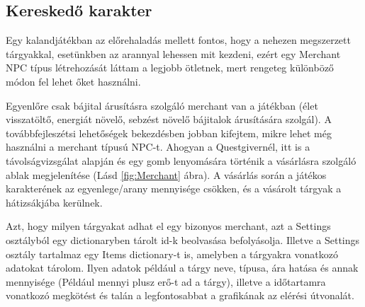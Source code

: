 \subsection{Kereskedő karakter}

\indent \indent Egy kalandjátékban az előrehaladás mellett fontos, hogy a nehezen megszerzett tárgyakkal, esetünkben az arannyal lehessen mit kezdeni, ezért egy Merchant NPC típus létrehozását láttam a legjobb ötletnek, mert rengeteg különböző módon fel lehet őket használni. 

Egyenlőre csak bájital árusításra szolgáló merchant van a játékban (élet visszatöltő, energiát növelő, sebzést növelő bájitalok árusítására szolgál). A továbbfejleszétsi lehetőségek bekezdésben jobban kifejtem, mikre lehet még használni a merchant típusú NPC-t.  Ahogyan a Questgivernél, itt is a távolságvizsgálat alapján és egy gomb lenyomására történik a vásárlásra szolgáló ablak megjelenítése (Lásd \ref{fig:Merchant} ábra). A vásárlás során a játékos karakterének az egyenlege/arany mennyisége csökken, és a vásárolt tárgyak a hátizsákjába kerülnek.

Azt, hogy milyen tárgyakat adhat el egy bizonyos merchant, azt a Settings osztályból egy dictionaryben tárolt id-k beolvasása befolyásolja. Illetve a Settings osztály tartalmaz egy Items dictionary-t is, amelyben a tárgyakra vonatkozó adatokat tárolom. Ilyen adatok például a tárgy neve, típusa, ára hatása és annak mennyisége (Például mennyi plusz erő-t ad a tárgy), illetve a időtartamra vonatkozó megkötést és talán a legfontosabbat a grafikának az elérési útvonalát.  

